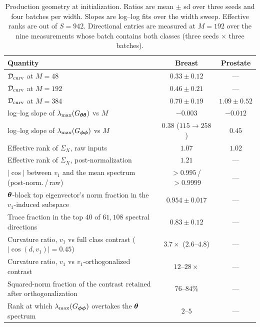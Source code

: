 \begin{table}[htbp]
\centering
\small
\setlength{\tabcolsep}{4pt}
\caption{Production geometry at initialization. Ratios are mean $\pm$ sd over
three seeds and four batches per width. Slopes are log--log fits over the width
sweep. Effective ranks are out of $S = 942$. Directional entries are measured
at $M = 192$ over the nine measurements whose batch contains both classes
(three seeds $\times$ three batches).}
\label{tab:app_geom}
\begin{tabular}{lcc}
\toprule
Quantity & Breast & Prostate \\
\midrule
$\mathcal{D}_{\mathrm{curv}}$ at $M = 48$ & $0.33 \pm 0.12$ & --- \\
$\mathcal{D}_{\mathrm{curv}}$ at $M = 192$ & $0.46 \pm 0.21$ & --- \\
$\mathcal{D}_{\mathrm{curv}}$ at $M = 384$ & $0.70 \pm 0.19$ & $1.09 \pm 0.52$ \\
log--log slope of $\lambda_{\max}(G_{{\boldsymbol{\theta}}{\boldsymbol{\theta}}})$ vs $M$ & $-0.003$ & $-0.012$ \\
log--log slope of $\lambda_{\max}(G_{{\boldsymbol{\phi}}{\boldsymbol{\phi}}})$ vs $M$ & $0.38$ ($115 \to 258$) & $0.45$ \\
Effective rank of $\Sigma_X$, raw inputs & $1.07$ & $1.02$ \\
Effective rank of $\Sigma_X$, post-normalization & $1.21$ & --- \\
$|\cos|$ between $v_1$ and the mean spectrum (post-norm.\,/\,raw) & $>0.995$\,/\,$>0.9999$ & --- \\
${\boldsymbol{\theta}}$-block top eigenvector's norm fraction in the $v_1$-induced subspace & $0.954 \pm 0.017$ & --- \\
Trace fraction in the top $40$ of $61{,}108$ spectral directions & $0.83 \pm 0.12$ & --- \\
Curvature ratio, $v_1$ vs full class contrast ($|\cos(d,v_1)| = 0.45$) & $3.7\times$ ($2.6$--$4.8$) & --- \\
Curvature ratio, $v_1$ vs $v_1$-orthogonalized contrast & $12$--$28\times$ & --- \\
Squared-norm fraction of the contrast retained after orthogonalization & $76$--$84\%$ & --- \\
Rank at which $\lambda_{\max}(G_{{\boldsymbol{\phi}}{\boldsymbol{\phi}}})$ overtakes the ${\boldsymbol{\theta}}$ spectrum & $2$--$5$ & --- \\
\bottomrule
\end{tabular}
\end{table}

